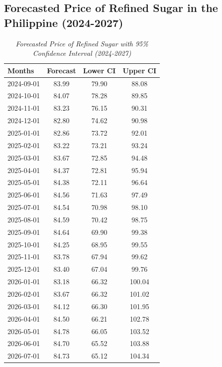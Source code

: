 \documentclass[11pt]{article}
\begin{document}
\subsection{Forecasted Price of Refined Sugar in the Philippine (2024-2027)}
\label{forecast_table}
\begin{table}[H]
    \caption*{\textit{Forecasted Price of Refined Sugar with 95\% Confidence Interval (2024-2027)}}
    \centering
    \begin{tabular}{lccc}
        \toprule
        Months & Forecast & Lower CI & Upper CI \\
        \midrule
        2024-09-01 & 83.99 & 79.90 & 88.08 \\
        2024-10-01 & 84.07 & 78.28 & 89.85 \\
        2024-11-01 & 83.23 & 76.15 & 90.31 \\
        2024-12-01 & 82.80 & 74.62 & 90.98 \\
        2025-01-01 & 82.86 & 73.72 & 92.01 \\
        2025-02-01 & 83.22 & 73.21 & 93.24 \\
        2025-03-01 & 83.67 & 72.85 & 94.48 \\
        2025-04-01 & 84.37 & 72.81 & 95.94 \\
        2025-05-01 & 84.38 & 72.11 & 96.64 \\
        2025-06-01 & 84.56 & 71.63 & 97.49 \\
        2025-07-01 & 84.54 & 70.98 & 98.10 \\
        2025-08-01 & 84.59 & 70.42 & 98.75 \\
        2025-09-01 & 84.64 & 69.90 & 99.38 \\
        2025-10-01 & 84.25 & 68.95 & 99.55 \\
        2025-11-01 & 83.78 & 67.94 & 99.62 \\
        2025-12-01 & 83.40 & 67.04 & 99.76 \\
        2026-01-01 & 83.18 & 66.32 & 100.04 \\
        2026-02-01 & 83.67 & 66.32 & 101.02 \\
        2026-03-01 & 84.12 & 66.30 & 101.95 \\
        2026-04-01 & 84.50 & 66.21 & 102.78 \\
        2026-05-01 & 84.78 & 66.05 & 103.52 \\
        2026-06-01 & 84.70 & 65.52 & 103.88 \\
        2026-07-01 & 84.73 & 65.12 & 104.34 \\

\end{tabular}
\end{table}
\end{document}
